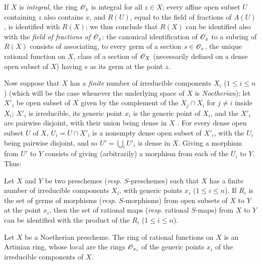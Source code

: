 If $X$ is \emph{integral}, the ring $\mathscr{O}_z$ is integral for all $z\in X$; every affine open subset $U$ containing $z$ also contains $x$, and $R(U)$, equal to the field of fractions of $A(U)$, is identified with $R(X)$; we thus conclude that $R(X)$ can be identified also with the \emph{field of fractions of $\mathscr{O}_z$}: the canonical identification of $\mathscr{O}_z$ to a subring of $R(X)$ consists of associating, to every germ of a section $s\in\mathscr{O}_z$, the unique rational function on $X$,  class of a section of $\mathscr{O}_X$ (necessarily defined on a dense open subset of $X$) having $s$ as its germ at the point $z$.

\begin{env}[7.1.6]
\label{1.7.1.6}
Now suppose that $X$ has a \emph{finite} number of irreducible components $X_i$ ($1\leqslant i\leqslant n$) (which will be the case whenever the underlying space of $X$ is \emph{Noetherian}); let $X'_i$ be open subset of $X$ given by the complement of the $X_j\cap X_i$ for $j\neq i$ inside $X_i$; $X'_i$ is irreducible, its generic point $x_i$ is the generic point of $X_i$, and the $X'_i$ are pairwise disjoint, with their union being dense in $X$ .
For every dense open subset $U$ of $X$, $U_i=U\cap X'_i$ is a nonempty dense open subset of $X'_i$, with the $U_i$ being pairwise disjoint, and so $U'=\bigcup_i U'_i$ is dense in $X$.
Giving a morphism from $U'$ to $Y$ consists of giving (arbitrarily) a morphism from each of the $U_i$ to $Y$.
Thus:
\end{env}

\begin{prop}[7.1.7]
\label{1.7.1.7}
Let $X$ and $Y$ be two preschemes (\emph{resp.} $S$-preschemes) such that $X$ has a finite number of irreducible components $X_i$, with generic points $x_i$ ($1\leqslant i\leqslant n$).
If $R_i$ is the set of germs of morphisms (\emph{resp.} $S$-morphisms) from open subsets of $X$ to $Y$ at the point $x_i$, then the set of rational maps (\emph{resp.} rational $S$-maps) from $X$ to $Y$ can be identified with the product of the $R_i$ ($1\leqslant i\leqslant n$).
\end{prop}

\begin{cor}[7.1.8]
\label{1.7.1.8}
Let $X$ be a Noetherian prescheme.
The ring of rational functions on $X$ is an Artinian ring, whose local  are the rings $\mathscr{O}_{x_i}$ of the generic points $x_i$ of the irreducible components of $X$.
\end{cor}

